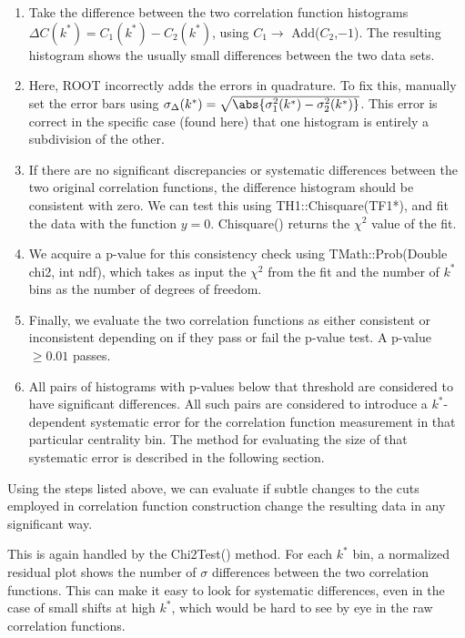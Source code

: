 \begin{enumerate}
\item Take the difference between the two correlation function histograms $\Delta C(k^*) = C_1(k^*) - C_2(k^*)$, using $C_1\rightarrow$ Add($C_2$,$-1$).  
The resulting histogram shows the usually small differences between the two data sets.
\item Here, ROOT incorrectly adds the errors in quadrature.  
To fix this, manually set the error bars using $\sigma_{\Delta}(k^*) = \sqrt{ \abs{ \sigma_1^2(k^*) - \sigma_2^2(k^*) }}$.  
This error is correct in the specific case (found here) that one histogram is entirely a subdivision of the other.
\item If there are no significant discrepancies or systematic differences between the two original correlation functions, the difference histogram should be consistent with zero.  
We can test this using TH1::Chisquare(TF1*), and fit the data with the function $y=0$.  
Chisquare() returns the $\chi^2$ value of the fit.
\item We acquire a p-value for this consistency check using TMath::Prob(Double chi2, int ndf), which takes as input the $\chi^2$ from the fit and the number of $k^*$ bins as the number of degrees of freedom.  
\item Finally, we evaluate the two correlation functions as either consistent or inconsistent depending on if they pass or fail the p-value test.  
A p-value $\geq 0.01$ passes.  
\item All pairs of histograms with p-values below that threshold are considered to have significant differences.  
All such pairs are considered to introduce a $k^*$-dependent systematic error for the correlation function measurement in that particular centrality bin.  
The method for evaluating the size of that systematic error is described in the following section.
\end{enumerate}

Using the steps listed above, we can evaluate if subtle changes to the cuts employed in correlation function construction change the resulting data in any significant way.  

This is again handled by the Chi2Test() method.  
For each $k^*$ bin, a normalized residual plot shows the number of $\sigma$ differences between the two correlation functions.  
This can make it easy to look for systematic differences, even in the case of small shifts at high $k^*$, which would be hard to see by eye in the raw correlation functions.

